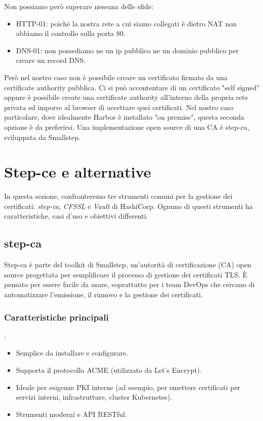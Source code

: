 \documentclass[12pt]{report}
\begin{document}
Non possiamo però superare nessuna delle sfide: 
\begin{itemize}
    \item HTTP-01: poiché la nostra rete a cui siamo collegati è dietro NAT non abbiamo il controllo sulla porta 80.
    \item DNS-01: non possediamo ne un ip pubblico ne un dominio pubblico per creare un record DNS.
\end{itemize}
Però nel nostro caso non è possibile creare un certificato firmato da una certificate authority pubblica.
Ci si può accontentare di un certificato "self signed" oppure è possibile create una certificate authority all'interno della propria rete privata ed imporre al browser di accettare quei certificati. Nel nostro caso particolare, dove idealmente Harbor è installato "on premise", questa seconda opzione è da preferirsi. Una implementazione open source di una CA è step-ca, sviluppata da Smallstep.
\section{Step-ce e alternative}
In questa sezione, confronteremo tre strumenti comuni per la gestione dei certificati: \textit{step-ca}, \textit{CFSSL} e \textit{Vault} di HashiCorp. Ognuno di questi strumenti ha caratteristiche, casi d'uso e obiettivi differenti.

\subsection{step-ca}
Step-ca è parte del toolkit di Smallstep, un'autorità di certificazione (CA) open source progettata per semplificare il processo di gestione dei certificati TLS. È pensato per essere facile da usare, soprattutto per i team DevOps che cercano di automatizzare l'emissione, il rinnovo e la gestione dei certificati.

\subsubsection{Caratteristiche principali}:
\begin{itemize}
    \item Semplice da installare e configurare.
    \item Supporta il protocollo ACME (utilizzato da Let's Encrypt).
    \item Ideale per esigenze PKI interne (ad esempio, per emettere certificati per servizi interni, infrastrutture, cluster Kubernetes).
    \item Strumenti moderni e API RESTful.
\end{itemize}
\end{document}
